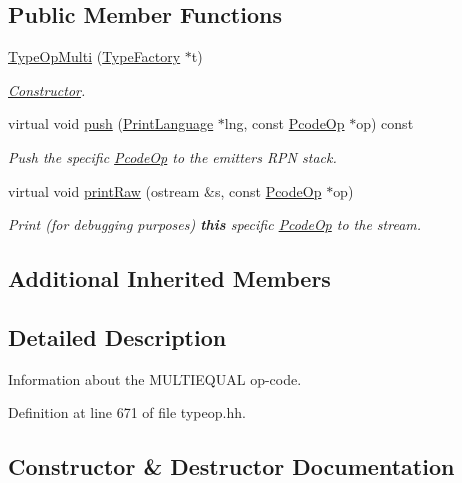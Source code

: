 \subsection*{Public Member Functions}
\begin{DoxyCompactItemize}
\item 
\mbox{\hyperlink{class_type_op_multi_ac987a1892bf43ae299859a83d65f6c11}{Type\+Op\+Multi}} (\mbox{\hyperlink{class_type_factory}{Type\+Factory}} $\ast$t)
\begin{DoxyCompactList}\small\item\em \mbox{\hyperlink{class_constructor}{Constructor}}. \end{DoxyCompactList}\item 
virtual void \mbox{\hyperlink{class_type_op_multi_aa13efcfb7991b09e1c041099aa4773cd}{push}} (\mbox{\hyperlink{class_print_language}{Print\+Language}} $\ast$lng, const \mbox{\hyperlink{class_pcode_op}{Pcode\+Op}} $\ast$op) const
\begin{DoxyCompactList}\small\item\em Push the specific \mbox{\hyperlink{class_pcode_op}{Pcode\+Op}} to the emitter\textquotesingle{}s R\+PN stack. \end{DoxyCompactList}\item 
virtual void \mbox{\hyperlink{class_type_op_multi_a776288910290e0d34a5dbf17893a6789}{print\+Raw}} (ostream \&s, const \mbox{\hyperlink{class_pcode_op}{Pcode\+Op}} $\ast$op)
\begin{DoxyCompactList}\small\item\em Print (for debugging purposes) {\bfseries{this}} specific \mbox{\hyperlink{class_pcode_op}{Pcode\+Op}} to the stream. \end{DoxyCompactList}\end{DoxyCompactItemize}
\subsection*{Additional Inherited Members}


\subsection{Detailed Description}
Information about the M\+U\+L\+T\+I\+E\+Q\+U\+AL op-\/code. 

Definition at line 671 of file typeop.\+hh.



\subsection{Constructor \& Destructor Documentation}
\mbox{\label{class_type_op_multi_ac987a1892bf43ae299859a83d65f6c11}} 
